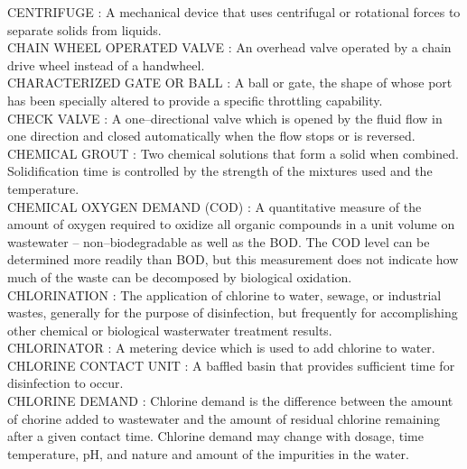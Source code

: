 \vspace{0.15cm}
CENTRIFUGE :  A mechanical device that uses centrifugal or rotational forces to separate solids from liquids.\\
\vspace{0.15cm}
CHAIN WHEEL OPERATED VALVE :   An overhead valve operated by a chain drive wheel instead of a handwheel.\\
\vspace{0.15cm}
CHARACTERIZED GATE OR BALL :   A ball or gate, the shape of whose port has been specially altered to provide a specific throttling capability.\\
\vspace{0.15cm}
CHECK VALVE :   A one–directional valve which is opened by the fluid flow in one direction and closed automatically when the flow stops or is reversed.\\
\vspace{0.15cm}
CHEMICAL GROUT :  Two chemical solutions that form a solid when combined. Solidification time is controlled by the strength of the mixtures used and the temperature. \\
\vspace{0.15cm}
CHEMICAL OXYGEN DEMAND (COD) :   A quantitative measure of the amount of oxygen required to oxidize all organic compounds in a unit volume on wastewater – non–biodegradable as well as the BOD. The COD level can be determined more readily than BOD, but this measurement does not indicate how much of the waste can be decomposed by biological oxidation.\\
\vspace{0.15cm}
CHLORINATION :   The application of chlorine to water, sewage, or industrial wastes, generally for the purpose of disinfection, but frequently for accomplishing other chemical or biological wasterwater treatment results.\\
\vspace{0.15cm}
CHLORINATOR :  A metering device which is used to add chlorine to water.\\
\vspace{0.15cm}
CHLORINE CONTACT UNIT :  A baffled basin that provides sufficient time for disinfection to occur.\\
\vspace{0.15cm}
CHLORINE DEMAND :  Chlorine demand is the difference between the amount of chorine added to wastewater and the amount of residual chlorine remaining after a given contact time. Chlorine demand may change with dosage, time temperature, pH, and nature and amount of the impurities in the water.\\
